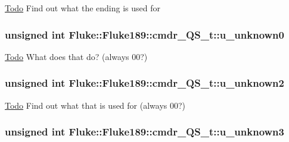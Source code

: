 \label{structFluke_1_1Fluke189_1_1cmdr__QS__t_a08dec92163b6c7a734cdf4aa185d0875}
\begin{Desc}
\item[\hyperlink{todo__todo000008}{Todo}]Find out what the ending is used for \end{Desc}
\hypertarget{structFluke_1_1Fluke189_1_1cmdr__QS__t_a944537557b063c776a16a12218d7e8f8}{
\subsubsection[{u\_\-unknown0}]{\setlength{\rightskip}{0pt plus 5cm}unsigned int {\bf Fluke::Fluke189::cmdr\_\-QS\_\-t::u\_\-unknown0}}}
\label{structFluke_1_1Fluke189_1_1cmdr__QS__t_a944537557b063c776a16a12218d7e8f8}
\begin{Desc}
\item[\hyperlink{todo__todo000003}{Todo}]What does that do? (always 00?) \end{Desc}
\hypertarget{structFluke_1_1Fluke189_1_1cmdr__QS__t_ada1764cd45a6a8339b44a41d30fbdb86}{
\subsubsection[{u\_\-unknown2}]{\setlength{\rightskip}{0pt plus 5cm}unsigned int {\bf Fluke::Fluke189::cmdr\_\-QS\_\-t::u\_\-unknown2}}}
\label{structFluke_1_1Fluke189_1_1cmdr__QS__t_ada1764cd45a6a8339b44a41d30fbdb86}
\begin{Desc}
\item[\hyperlink{todo__todo000005}{Todo}]Find out what that is used for (always 00?) \end{Desc}
\hypertarget{structFluke_1_1Fluke189_1_1cmdr__QS__t_a5df8b378d557e36494d127471e465612}{
\subsubsection[{u\_\-unknown3}]{\setlength{\rightskip}{0pt plus 5cm}unsigned int {\bf Fluke::Fluke189::cmdr\_\-QS\_\-t::u\_\-unknown3}}}
